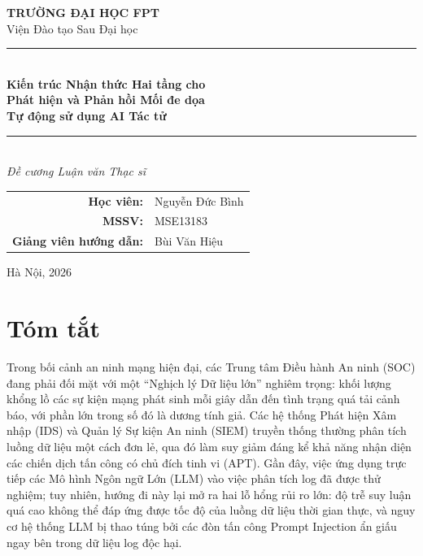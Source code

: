 \documentclass[12pt,a4paper]{article}
\begin{document}

\begin{titlepage}
    \centering

    \vspace*{1cm}
    {\large\textbf{TRƯỜNG ĐẠI HỌC FPT}}\\[0.3cm]
    {\normalsize Viện Đào tạo Sau Đại học}\\[2cm]

    \rule{\textwidth}{0.5pt}\\[0.5cm]
    {\LARGE\textbf{Kiến trúc Nhận thức Hai tầng cho\\Phát hiện và Phản hồi Mối đe dọa\\Tự động sử dụng AI Tác tử}}\\[0.5cm]
    \rule{\textwidth}{0.5pt}\\[1cm]

    {\large\textit{Đề cương Luận văn Thạc sĩ}}\\[2cm]

    \begin{tabular}{rl}
        \textbf{Học viên:}             & Nguyễn Đức Bình \\
        \textbf{MSSV:}                 & MSE13183        \\[0.5cm]
        \textbf{Giảng viên hướng dẫn:} & Bùi Văn Hiệu    \\
    \end{tabular}

    \vfill
    {\normalsize Hà Nội, 2026}

\end{titlepage}

\newpage
{}
\section*{Tóm tắt}
Trong bối cảnh an ninh mạng hiện đại, các Trung tâm Điều hành An ninh (SOC) đang phải đối mặt với một ``Nghịch lý Dữ liệu lớn'' nghiêm trọng: khối lượng khổng lồ các sự kiện mạng phát sinh mỗi giây dẫn đến tình trạng quá tải cảnh báo, với phần lớn trong số đó là dương tính giả. Các hệ thống Phát hiện Xâm nhập (IDS) và Quản lý Sự kiện An ninh (SIEM) truyền thống thường phân tích luồng dữ liệu một cách đơn lẻ, qua đó làm suy giảm đáng kể khả năng nhận diện các chiến dịch tấn công có chủ đích tinh vi (APT). Gần đây, việc ứng dụng trực tiếp các Mô hình Ngôn ngữ Lớn (LLM) vào việc phân tích log đã được thử nghiệm; tuy nhiên, hướng đi này lại mở ra hai lỗ hổng rủi ro lớn: độ trễ suy luận quá cao không thể đáp ứng được tốc độ của luồng dữ liệu thời gian thực, và nguy cơ hệ thống LLM bị thao túng bởi các đòn tấn công Prompt Injection ẩn giấu ngay bên trong dữ liệu log độc hại.
\end{document}
